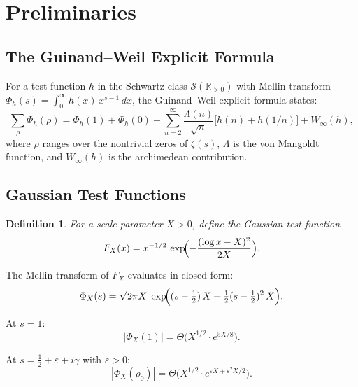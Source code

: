 \documentclass[12pt]{article}
\newtheorem{definition}[theorem]{Definition}
\theoremstyle{remark}
\begin{document}
\section{Preliminaries}\label{sec:prelim}

\subsection{The Guinand--Weil Explicit Formula}

For a test function $h$ in the Schwartz class $\mathcal{S}(\mathbb{R}_{>0})$
with Mellin transform
$\Phi_h(s) = \int_0^\infty h(x)\, x^{s-1}\, dx$,
the Guinand--Weil explicit formula states:
\begin{equation}\label{eq:GW}
\sum_{\rho} \Phi_h(\rho)
= \Phi_h(1) + \Phi_h(0)
  - \sum_{n=2}^{\infty} \frac{\Lambda(n)}{\sqrt{n}}
    \bigl[h(n) + h(1/n)\bigr]
  + W_\infty(h),
\end{equation}
where $\rho$ ranges over the nontrivial zeros of $\zeta(s)$, $\Lambda$ is
the von Mangoldt function, and $W_\infty(h)$ is the archimedean contribution.

\subsection{Gaussian Test Functions}

\begin{definition}\label{def:gaussian}
For a scale parameter $X > 0$, define the Gaussian test function
\begin{equation}\label{eq:FX}
F_X(x) = x^{-1/2}\,
\exp\!\Bigl(-\frac{(\log x - X)^2}{2X}\Bigr).
\end{equation}
\end{definition}

The Mellin transform of $F_X$ evaluates in closed form:
\begin{equation}\label{eq:PhiX}
\Phi_X(s) = \sqrt{2\pi X}\;
\exp\!\Bigl((s - \tfrac{1}{2})\,X
  + \tfrac{1}{2}(s - \tfrac{1}{2})^2\,X\Bigr).
\end{equation}

At $s = 1$:
\begin{equation}\label{eq:Phi1}
|\Phi_X(1)| = \Theta\bigl(X^{1/2} \cdot e^{5X/8}\bigr).
\end{equation}

At $s = \tfrac{1}{2} + \varepsilon + i\gamma$ with $\varepsilon > 0$:
\begin{equation}\label{eq:Phirho}
|\Phi_X(\rho_0)| = \Theta\bigl(X^{1/2} \cdot
  e^{\varepsilon X + \varepsilon^2 X/2}\bigr).
\end{equation}
\end{document}
